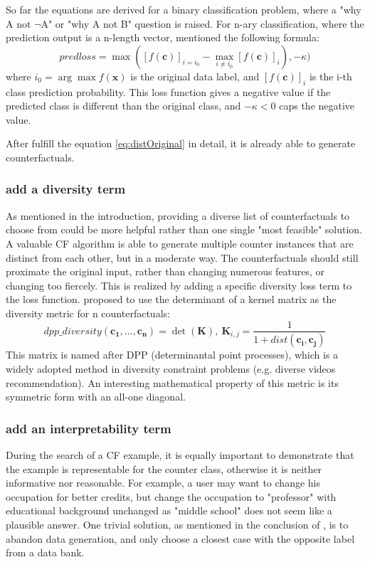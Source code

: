 So far the equations are derived for a binary classification problem, where a "why A not $\neg${A}" or "why A not B" question is raised. For n-ary classification, where the prediction output is a n-length vector, \cite{prototype} mentioned the following formula:
\begin{equation}\label{eq:lossPred}
  predloss=\max([f(\textbf{c})]_{i=i_0}-\max_{i\neq i_0}[f(\textbf{c})]_i),-\kappa)
\end{equation}
where $i_0=\arg\max f(\textbf{x})$ is the original data label, and $[f(\textbf{c})]_i$ is the i-th class prediction probability. This loss function gives a negative value if the predicted class is different than the original class, and $-\kappa < 0$ caps the negative value.

After fulfill the equation \ref{eq:distOriginal} in detail, it is already able to generate counterfactuals.
\subsubsection{add a diversity term}
As mentioned in the introduction, providing a diverse list of counterfactuals to choose from could be more helpful rather than one single "most feasible" solution. A valuable CF algorithm is able to generate multiple counter instances that are distinct from each other, but in a moderate way. The counterfactuals should still proximate the original input, rather than changing numerous features, or changing too fiercely. This is realized by adding a specific diversity loss term to the loss function. \cite{DiCE} proposed to use the determinant of a kernel matrix as the diversity metric for n counterfactuals:
\begin{equation}\label{eq:dpp}
  dpp\_diversity(\mathbf{c_1,\dots,c_n})=\det(\mathbf{K}),\ \mathbf{K}_{i,j}=\frac{1}{1+dist(\mathbf{c_i,c_j})}
\end{equation}
This matrix is named after DPP (determinantal point processes), which is a widely adopted method in diversity constraint problems (e.g. diverse videos recommendation). An interesting mathematical property of this metric is its symmetric form with an all-one diagonal.
\subsubsection{add an interpretability term}
During the search of a CF example, it is equally important to demonstrate that the example is representable for the counter class, otherwise it is neither informative nor reasonable. For example, a user may want to change his occupation for better credits, but change the occupation to "professor" with educational background unchanged as "middle school" does not seem like a plausible answer. One trivial solution, as mentioned in the conclusion of \cite{bertossi2020asp}, is to abandon data generation, and only choose a closest case with the opposite label from a data bank. 

